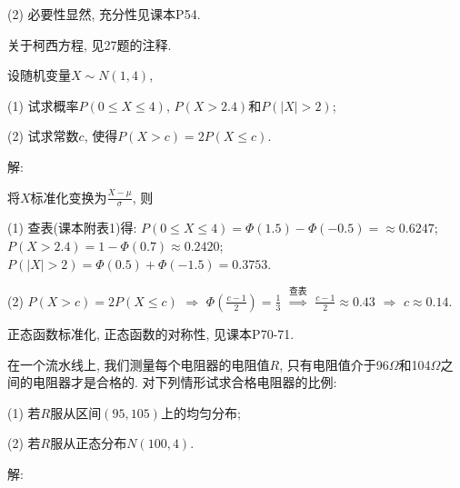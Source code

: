 \documentclass[standard]{ExBook}
\begin{document}
\begin{qitems}
\begin{bbox}
(2) 必要性显然, 充分性见课本P54.

\textcolor{themeColor}{\selectfont {} 关于柯西方程, 见27题的注释.}
    \end{bbox}

\vspace{-5em}

    \begin{bbox}
    \begin{shaded}
        \qitem
设随机变量$X\sim N(1,4)$,

(1) 试求概率$P(0 \leq X \leq 4)$, $P(X>2.4)$和$P(|X|>2)$;

(2) 试求常数$c$, 使得$P(X>c)=2P(X \leq c)$.
    \end{shaded}
    \end{bbox}

\vspace{-5em}

    \begin{bbox}
解: 

将$X$标准化变换为$\displaystyle\frac{X-\mu}{\sigma}$, 则

(1) 查表(课本附表1)得: $P(0\leq X\leq 4)=\Phi(1.5)-\Phi(-0.5)=\approx0.6247$; $P(X>2.4)=1-\Phi(0.7)\approx0.2420$; $P(|X|>2)=\Phi(0.5)+\Phi(-1.5)=0.3753$.

(2) $P(X>c)=2P(X \leq c)$ $\Longrightarrow$ $\Phi(\frac{c-1}{2})=\frac{1}{3}$ $\overset{\text{查表}}{\Longrightarrow}$ $\frac{c-1}{2}\approx0.43$ $\Longrightarrow$ $c\approx0.14$.

\textcolor{themeColor}{\selectfont {} 正态函数标准化, 正态函数的对称性, 见课本P70-71.}
    \end{bbox}

\vspace{-5em}

    \begin{bbox}
    \begin{shaded}
        \qitem
在一个流水线上, 我们测量每个电阻器的电阻值$R$, 只有电阻值介于96$\Omega$和104$\Omega$之间的电阻器才是合格的. 对下列情形试求合格电阻器的比例:

(1) 若$R$服从区间$(95,105)$上的均匀分布;

(2) 若$R$服从正态分布$N(100,4)$.
    \end{shaded}
    \end{bbox}

\vspace{-5em}

    \begin{bbox}
解: 


\end{bbox}
\end{qitems}
\end{document}
